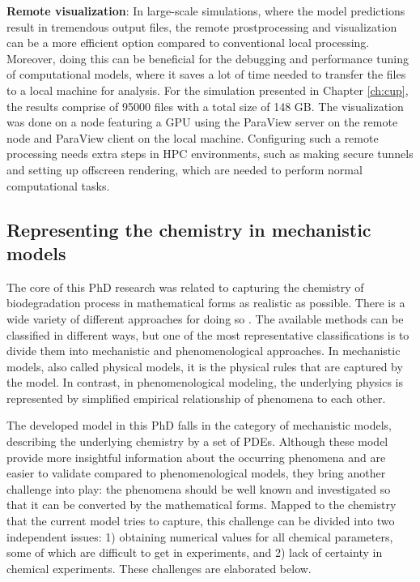 \begin{itemize}
\textbf{Remote visualization}: In large-scale simulations, where the model predictions result in tremendous output files, the remote prostprocessing and visualization can be a more efficient option compared to conventional local processing. Moreover, doing this can be beneficial for the debugging and performance tuning of computational models, where it saves a lot of time needed to transfer the files to a local machine for analysis. For the simulation presented in Chapter \ref{ch:cup}, the results comprise of \num{95000} files with a total size of 148 GB. The visualization was done on a node featuring a GPU using the ParaView server on the remote node and ParaView client on the local machine. Configuring such a remote processing needs extra steps in HPC environments, such as making secure tunnels and setting up offscreen rendering, which are needed to perform normal computational tasks. 
\end{itemize}

\subsection{Representing the chemistry in mechanistic models}


The core of this PhD research was related to capturing the chemistry of biodegradation process in mathematical forms as realistic as possible. There is a wide variety of different approaches for doing so \cite{Abdalla2020}. The available methods can be classified in different ways, but one of the most representative classifications is to divide them into mechanistic and phenomenological approaches. In mechanistic models, also called physical models, it is the physical rules that are captured by the model. In contrast, in phenomenological modeling, the underlying physics is represented by simplified empirical relationship of phenomena to each other. 

The developed model in this PhD falls in the category of mechanistic models, describing the underlying chemistry by a set of PDEs. Although these model provide more insightful information about the occurring phenomena and are easier to validate compared to phenomenological models, they bring another challenge into play: the phenomena should be well known and investigated so that it can be converted by the mathematical forms. Mapped to the chemistry that the current model tries to capture, this challenge can be divided into two independent issues: 1) obtaining numerical values for all chemical parameters, some of which are difficult to get in experiments, and 2) lack of certainty in chemical experiments. These challenges are elaborated below.

